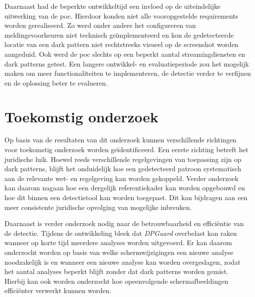 \vspace{1em}

Daarnaast had de beperkte ontwikkeltijd een invloed op de uiteindelijke uitwerking van de \acrshort{poc}. Hierdoor konden niet alle vooropgestelde requirements worden gerealiseerd. Zo werd onder andere het configureren van meldingsvoorkeuren niet technisch geïmplementeerd en kon de gedetecteerde locatie van een dark pattern niet rechtstreeks visueel op de screenshot worden aangeduid. Ook werd de \acrshort{poc} slechts op een beperkt aantal streamingdiensten en dark patterns getest. Een langere ontwikkel- en evaluatieperiode zou het mogelijk maken om meer functionaliteiten te implementeren, de detectie verder te verfijnen en de oplossing beter te evalueren.

\vspace{1em}

\section{Toekomstig onderzoek}
\label{sec:vervolgdoelstelling}

\vspace{1em}

Op basis van de resultaten van dit onderzoek kunnen verschillende richtingen voor toekomstig onderzoek worden geïdentificeerd. Een eerste richting betreft het juridische luik. Hoewel reeds verschillende regelgevingen van toepassing zijn op dark patterns, blijft het onduidelijk hoe een gedetecteerd patroon systematisch aan de relevante wet- en regelgeving kan worden gekoppeld. Verder onderzoek kan daarom nagaan hoe een dergelijk referentiekader kan worden opgebouwd en hoe dit binnen een detectietool kan worden toegepast. Dit kan bijdragen aan een meer consistente juridische opvolging van mogelijke inbreuken.

\vspace{1em}

Daarnaast is verder onderzoek nodig naar de betrouwbaarheid en efficiëntie van de detectie. Tijdens de ontwikkeling bleek dat \textit{DPGuard} overbelast kan raken wanneer op korte tijd meerdere analyses worden uitgevoerd. Er kan daarom onderzocht worden op basis van welke schermwijzigingen een nieuwe analyse noodzakelijk is en wanneer een nieuwe analyse kan worden overgeslagen, zodat het aantal analyses beperkt blijft zonder dat dark patterns worden gemist. Hierbij kan ook worden onderzocht hoe opeenvolgende schermafbeeldingen efficiënter verwerkt kunnen worden.

